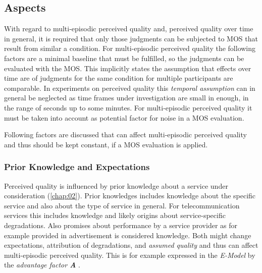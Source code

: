 \subsection{Aspects}
With regard to multi-episodic perceived quality and, perceived quality over time in general, it is required that only those judgments can be subjected to \ac{MOS} that result from similar a condition.
For multi-episodic perceived quality the following factors are a minimal baseline that must be fulfilled, so the judgments can be evaluated with the \ac{MOS}.
This implicitly states the assumption that effects over time are of judgments for the same condition for multiple participants are comparable.
In experiments on perceived quality this \emph{temporal assumption} can in general be neglected as time frames under investigation are small in enough, \ie in the range of seconds up to some minutes.
For multi-episodic perceived quality it must be taken into account as potential factor for noise in a \ac{MOS} evaluation. %

Following factors are discussed that can affect multi-episodic perceived quality and thus should be kept constant, if a \ac{MOS} evaluation is applied.

\subsubsection*{Prior Knowledge and Expectations}
Perceived quality is influenced by prior knowledge about a service under consideration (\cf \autoref{chap:02}).
Prior knowledges includes knowledge about the specific service and also about the type of service in general.
For telecommunication services this includes knowledge and likely origins about service-specific degradations.
Also promises about performance by a service provider as for example provided in advertisement is considered knowledge.
Both might change expectations, attribution of degradations, and \emph{assumed quality} and thus can affect multi-episodic perceived quality.
This is for example expressed in the \emph{E-Model} by the \emph{advantage factor \textbf{A}} \citep{itu-t_g.107:_2014}.

